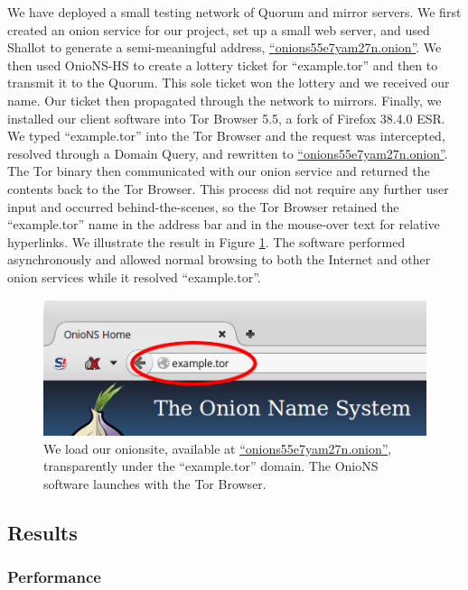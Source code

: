 \documentclass[USenglish,oneside,twocolumn]{article}
\begin{document}
We have deployed a small testing network of Quorum and mirror servers. We first created an onion service for our project, set up a small web server, and used Shallot to generate a semi-meaningful address, \href{http://onions55e7yam27n.onion}{``onions55e7yam27n.onion''}. We then used OnioNS-HS to create a lottery ticket for ``example.tor'' and then to transmit it to the Quorum. This sole ticket won the lottery and we received our name. Our ticket then propagated through the network to mirrors. Finally, we installed our client software into Tor Browser 5.5, a fork of Firefox 38.4.0 ESR. We typed ``example.tor'' into the Tor Browser and the request was intercepted, resolved through a Domain Query, and rewritten to \href{http://onions55e7yam27n.onion}{``onions55e7yam27n.onion''}. The Tor binary then communicated with our onion service and returned the contents back to the Tor Browser. This process did not require any further user input and occurred behind-the-scenes, so the Tor Browser retained the ``example.tor'' name in the address bar and in the mouse-over text for relative hyperlinks. We illustrate the result in Figure \ref{fig:prototypeExample}. The software performed asynchronously and allowed normal browsing to both the Internet and other onion services while it resolved ``example.tor''.

\begin{figure}[h]
	\centering
	\includegraphics[width=\linewidth]{../assets/images/example.png}
	\caption{We load our onionsite, available at \href{http://onions55e7yam27n.onion}{``onions55e7yam27n.onion''}, transparently under the ``example.tor'' domain. The OnioNS software launches with the Tor Browser.}
	\label{fig:prototypeExample}
\end{figure}

\subsection{Results}

\subsubsection{Performance}
\end{document}
